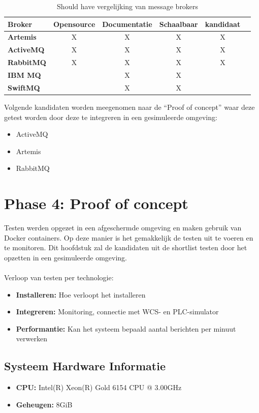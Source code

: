 \begin{table}[h!]
  \centering
  \footnotesize
\begin{tabular}{|l|c|c|c|c|c|}
  \hline
  \textbf{Broker} & \textbf{Opensource} & \textbf{Documentatie} & \textbf{Schaalbaar} & \textbf{kandidaat}\\ \hline
  \textbf{Artemis}   & X & X & X & X \\ \hline
  \textbf{ActiveMQ}  & X & X & X & X \\ \hline
  \textbf{RabbitMQ}  & X & X & X & X \\ \hline  
  \textbf{IBM MQ}    &   & X & X &  \\ \hline 
  \textbf{SwiftMQ}   &   & X & X &  \\ \hline 
\end{tabular}
\caption{Should have vergelijking van message brokers}
\label{tab:vergelijking_message_brokers_should_have}
\end{table}

Volgende kandidaten worden meegenomen naar de ``Proof of concept'' waar deze getest worden door deze te integreren in een gesimuleerde omgeving:
\begin{itemize}
  \item ActiveMQ
  \item Artemis
  \item RabbitMQ
\end{itemize}
    
\section{Phase 4: Proof of concept}
Testen werden opgezet in een afgeschermde omgeving en maken gebruik van Docker containers.
Op deze manier is het gemakkelijk de testen uit te voeren en te monitoren.
Dit hoofdstuk zal de kandidaten uit de shortlist testen door het opzetten in een gesimuleerde omgeving.
\\\\
Verloop van testen per technologie:
\begin{itemize}
  \item \textbf{Installeren:} Hoe verloopt het installeren
  \item \textbf{Integreren:} Monitoring, connectie met WCS- en PLC-simulator
  \item \textbf{Performantie:} Kan het systeem bepaald aantal berichten per minuut verwerken
\end{itemize}

\subsection{Systeem Hardware Informatie}
\begin{itemize}
    \item \textbf{CPU:} Intel(R) Xeon(R) Gold 6154 CPU @ 3.00GHz
    \item \textbf{Geheugen:} 8GiB
\end{itemize}

